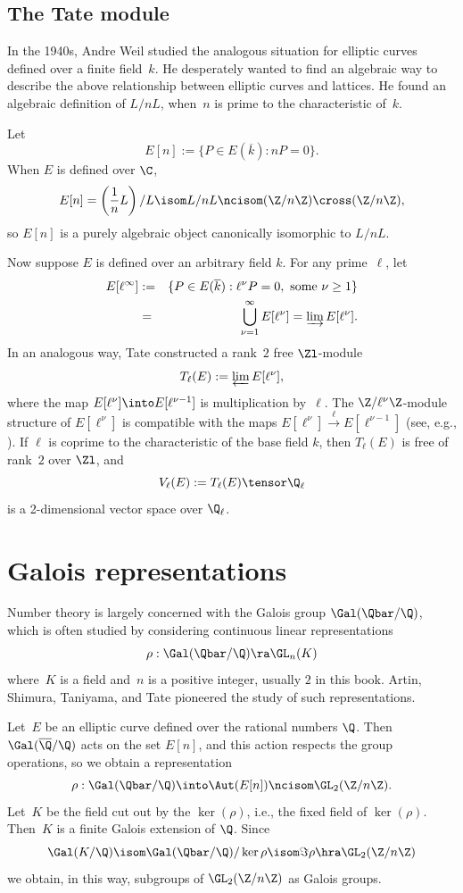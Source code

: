 \documentclass{report}
\begin{document}
\subsection{The Tate module}
 In the 1940s, Andre Weil studied the analogous situation for elliptic
curves defined over a finite field~$k$. He desperately wanted to find
an algebraic way to describe the above relationship between elliptic
curves and lattices.  He found an algebraic definition of
$L/nL$, when~$n$ is prime to the characteristic of~$k$.

Let
$$
  E[n]:=\{P\in E(\overline{k}) : nP = 0\}.
$$
When $E$ is defined over $\C$,
$$
  E[n]= \left(\frac{1}{n} L\right) / L
   \isom L / n L \ncisom (\Z/n\Z)\cross(\Z/n\Z),
$$
so $E[n]$ is a purely algebraic object canonically isomorphic
to $L/nL$.

Now suppose $E$ is defined over an arbitrary field $k$.
For any prime~$\ell$, let
\begin{eqnarray*}
  E[\ell^\infty]&:=&
  \{P\in E(\overline{k}) : \ell^{\nu}P = 0, \text{ some }
     \nu \geq 1\}\\
   &=& \bigcup_{\nu=1}^{\infty} E[\ell^{\nu}]
        = \varinjlim E[\ell^{\nu}].
\end{eqnarray*}
In an analogous way, Tate constructed a rank~$2$ free
$\Zl$-module
$$
  T_{\ell}(E):=\varprojlim E[\ell^{\nu}],
$$
where the map $E[\ell^{\nu}]\into E[\ell^{\nu-1}]$
is multiplication by~$\ell$.
The $\Z/\ell^{\nu}\Z$-module structure of $E[\ell^{\nu}]$ is compatible
with the maps $E[\ell^{\nu}]\xrightarrow{\ell} E[\ell^{\nu-1}]$
(see, e.g., \cite[III.7]{silverman:aec}).
If $\ell$ is coprime to the characteristic of the base field $k$,
then $T_{\ell}(E)$ is free of rank~$2$ over $\Zl$,
and
$$
 V_{\ell}(E):=T_{\ell}(E)\tensor\Q_{\ell}
$$
is a 2-dimensional vector space over $\Q_{\ell}$.

\section{Galois representations}
Number theory is largely concerned with the
Galois group $\Gal(\Qbar/\Q)$, which is often studied
by considering continuous linear representations
$$
\rho:\Gal(\Qbar/\Q)\ra \GL_n(K)
$$
where~$K$ is a field and~$n$
is a positive integer, usually $2$ in this book.
Artin, Shimura, Taniyama, and Tate pioneered the study of such representations.

Let~$E$ be an elliptic curve defined over the rational numbers $\Q$.
Then $\Gal(\overline{\Q}/\Q)$ acts on the set $E[n]$,
and this action respects the group operations, so
we obtain a representation
\begin{equation*}
\rho: \Gal(\Qbar/\Q) \into \Aut(E[n])\ncisom \GL_2(\Z/n\Z).
\end{equation*}
Let~$K$ be the field cut out by the $\ker(\rho)$, i.e., the
fixed field of $\ker(\rho)$.
Then~$K$ is a finite Galois extension of $\Q$.
Since
$$
  \Gal(K/\Q)\isom \Gal(\Qbar/\Q)/\ker\rho \isom
   \Im \rho \hra \GL_2(\Z/n\Z)
$$
we obtain, in this way, subgroups of $\GL_2(\Z/n\Z)$ as Galois groups.
\end{document}
